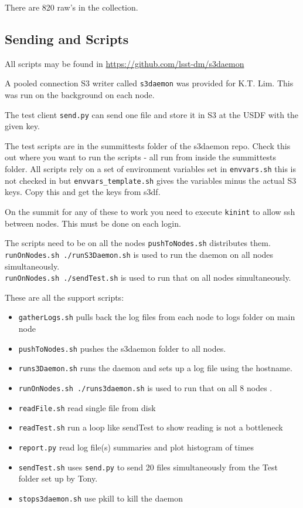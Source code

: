 There are 820 raw's in the collection.

\subsection{Sending  and Scripts} \label{sec:setup}

All scripts may be found in \url{https://github.com/lsst-dm/s3daemon}

A pooled connection S3 writer called {\tt s3daemon} was provided for K.T. Lim.
This was run on the background on each node.

The test client  {\tt send.py} can send one file and store it in S3 at the USDF with the given key.

The test scripts are in the summittests folder of the s3daemon repo.
Check this out where you want to run the scripts - all run from inside the summittests folder.
All scripts rely on a set of environment variables set in {\tt envvars.sh} this is not checked in but {\tt envvars\_template.sh} gives the variables minus the actual S3 keys. Copy this and get the keys from s3df.

On the summit for any of these to work you need to execute {\tt kinint} to allow ssh between nodes.
This must be done on each login.

The scripts need to be on all the nodes {\tt pushToNodes.sh} distributes them.\\
{\tt runOnNodes.sh ./runS3Daemon.sh} is used to run the daemon on all nodes simultaneously.\\
{\tt runOnNodes.sh ./sendTest.sh} is used to run that on all nodes simultaneously.

These  are all the support scripts:
\begin{itemize}
\item {\tt gatherLogs.sh} pulls back the log files from each node to logs folder on main node
\item {\tt pushToNodes.sh} pushes the s3daemon folder to all nodes.
\item {\tt runs3Daemon.sh} runs the daemon and sets up a log file using the hostname.
\item {\tt runOnNodes.sh ./runs3daemon.sh} is used to run that on all 8 nodes .
\item {\tt readFile.sh}  read  single file from disk
\item {\tt readTest.sh}  run a loop like sendTest to show reading is not a bottleneck
\item {\tt report.py}  read log file(s) summaries and plot histogram of times
\item {\tt sendTest.sh} uses {\tt send.py} to send 20 files simultaneously from the Test folder set up by Tony.
\item {\tt stops3daemon.sh}  use pkill to kill the daemon
\end{itemize}


